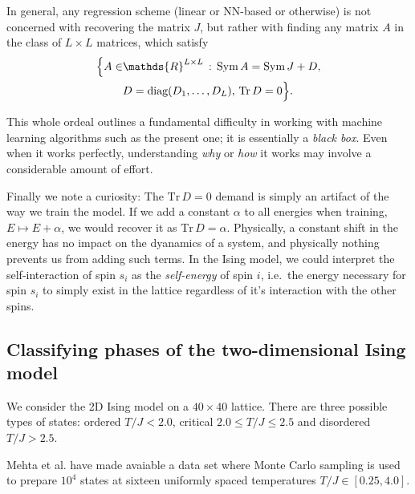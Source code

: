 \documentclass[a4paper, twocolumn]{article}
\begin{document}
In general, any regression scheme (linear or NN-based or otherwise) is not concerned with recovering the matrix $J$, but rather with finding any matrix $A$ in the class of $L\times L$ matrices, which satisfy
\begin{align}
\Big\{A\in &\mathds{R}^{L\times L}\,:\,\sym A=\sym J+D, \nonumber \\
& D=\text{diag}(D_1,\dots,D_L), \,\text{Tr}\,D=0 \Big\}.
\end{align}



This whole ordeal outlines a fundamental difficulty in working with machine learning algorithms such as the present one; it is essentially a \textit{black box}. Even when it works perfectly, understanding \textit{why} or \textit{how} it works may involve a considerable amount of effort.

Finally we note a curiosity: The $\text{Tr}\,D=0$ demand is simply an artifact of the way we train the model. If we add a constant $\alpha$ to all energies when training, $E\mapsto E+\alpha$, we would recover it as $\text{Tr}\,D=\alpha$. Physically, a constant shift in the energy has no impact on the dyanamics of a system, and physically nothing prevents us from adding such terms. In the Ising model, we could interpret the self-interaction of spin $s_i$ as the \textit{self-energy} of spin $i$, i.e.\ the energy necessary for spin $s_i$ to simply exist in the lattice regardless of it's interaction with the other spins.


\subsection{Classifying phases of the two-dimensional Ising model \label{sect:ising2d}}

We consider the 2D Ising model on a $40 \times 40$ lattice. There are three possible types of states: ordered $T/J < 2.0$, 
critical $2.0 \leq T/J \leq 2.5$ and disordered $ T/J > 2.5$.

Mehta et al.\autocite{mehta2018highbias} 
have made avaiable a data set where Monte Carlo sampling is used to prepare $10^4$ states at sixteen uniformly spaced 
temperatures $T/J \in [0.25,4.0]$. 
\end{document}
